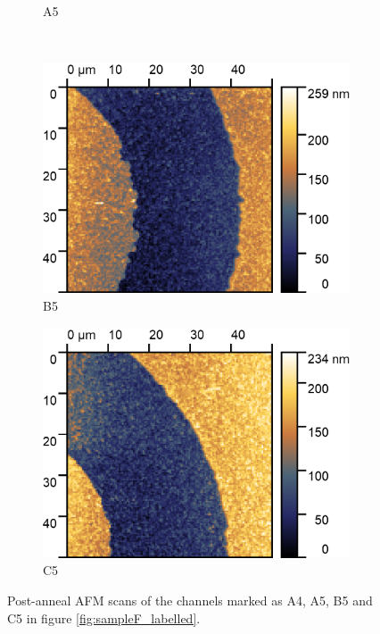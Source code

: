\begin{refsection}
\begin{figure}[H]
\begin{subfigure}[b]{0.45\textwidth}
        \caption{A5}
        \label{fig:a5_afm}
    \end{subfigure}
    \\
    \begin{subfigure}[b]{0.45\textwidth}
        \includegraphics[width=\textwidth]{Chapter3/Figs/Raster/Sample F 2022/b5_afm.png}
        \caption{B5}
        \label{fig:b5_afm}
    \end{subfigure}
    \hfill %
    \begin{subfigure}[b]{0.45\textwidth}
        \includegraphics[width=\textwidth]{Chapter3/Figs/Raster/Sample F 2022/c5_afm.png}
        \caption{C5}
        \label{fig:c5_afm}
    \end{subfigure}
    \caption{Post-anneal AFM scans of the channels marked as A4, A5, B5 and C5 in figure \ref{fig:sampleF_labelled}.}
    \label{fig:afm_scans}
\end{figure}


\end{refsection}
